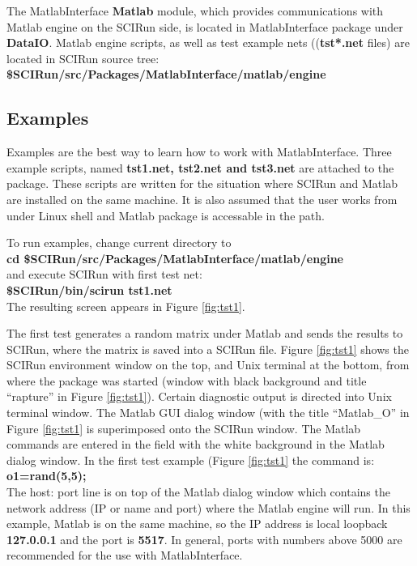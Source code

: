 \documentclass[12pt]{IEEEtran}
\newcommand{\sr}{SCIRun}
\begin{document}
The MatlabInterface {\bf Matlab} module, which provides communications with 
Matlab engine on the \sr{} side, is located in MatlabInterface 
package under {\bf DataIO}. Matlab engine scripts, as well as test 
example nets (({\bf tst*.net} files) are located in SCIRun source tree: \\
{\bf \$SCIRun/src/Packages/MatlabInterface/matlab/engine }\\

\subsection*{Examples} \indent

Examples are the best way to learn how to work with MatlabInterface.
Three example scripts, named {\bf tst1.net, tst2.net and tst3.net}
are attached to the package.
These scripts are written for the situation where SCIRun and 
Matlab are installed on the same machine. 
It is also assumed that the user works from under Linux
shell and Matlab package is accessable in the path. 

To run examples, change current directory to \\
{\bf cd \$SCIRun/src/Packages/MatlabInterface/matlab/engine } \\
and execute SCIRun with first test net: \\
{\bf \$SCIRun/bin/scirun  tst1.net} \\
The resulting screen appears in Figure \ref{fig:tst1}.

The first test generates a random matrix under Matlab and sends the
results to \sr{}, where the matrix is saved into a \sr{} file. 
Figure \ref{fig:tst1} shows the SCIRun environment window on the top,
and Unix terminal at the bottom, from where the package was started
(window with black background and title ``rapture'' in Figure 
\ref{fig:tst1}).  Certain diagnostic output is directed into Unix 
terminal window. 
The Matlab GUI dialog window (with the title
``Matlab\_O'' in Figure \ref{fig:tst1} is superimposed onto the \sr{}
window. The Matlab commands are entered in the field with the white
background in the Matlab dialog window.
In the first test example (Figure \ref{fig:tst1}
the command is: \\
{\bf o1=rand(5,5);} \\

The host:
port line is on top of the Matlab dialog window which
contains the network address (IP or name and port) where the Matlab 
engine will run. In this example, Matlab is on the same
machine, so the IP address is local loopback {\bf 127.0.0.1} and 
the port is {\bf 5517}. In general, ports with numbers above 5000
are recommended for the use with MatlabInterface. 
\end{document}
